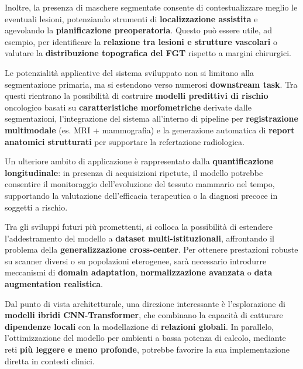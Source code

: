 Inoltre, la presenza di maschere segmentate consente di contestualizzare meglio le eventuali lesioni, potenziando strumenti di \textbf{localizzazione assistita} e agevolando la \textbf{pianificazione preoperatoria}. Questo può essere utile, ad esempio, per identificare la \textbf{relazione tra lesioni e strutture vascolari} o valutare la \textbf{distribuzione topografica del FGT} rispetto a margini chirurgici.


Le potenzialità applicative del sistema sviluppato non si limitano alla segmentazione primaria, ma si estendono verso numerosi \textbf{downstream task}. Tra questi rientrano la possibilità di costruire \textbf{modelli predittivi di rischio} oncologico basati su \textbf{caratteristiche morfometriche} derivate dalle segmentazioni, l’integrazione del sistema all’interno di pipeline per \textbf{registrazione multimodale} (es. MRI + mammografia) e la generazione automatica di \textbf{report anatomici strutturati} per supportare la refertazione radiologica.

Un ulteriore ambito di applicazione è rappresentato dalla \textbf{quantificazione longitudinale}: in presenza di acquisizioni ripetute, il modello potrebbe consentire il monitoraggio dell’evoluzione del tessuto mammario nel tempo, supportando la valutazione dell’efficacia terapeutica o la diagnosi precoce in soggetti a rischio.


Tra gli sviluppi futuri più promettenti, si colloca la possibilità di estendere l’addestramento del modello a \textbf{dataset multi-istituzionali}, affrontando il problema della \textbf{generalizzazione cross-center}. Per ottenere prestazioni robuste su scanner diversi o su popolazioni eterogenee, sarà necessario introdurre meccanismi di \textbf{domain adaptation}, \textbf{normalizzazione avanzata} o \textbf{data augmentation realistica}.

Dal punto di vista architetturale, una direzione interessante è l’esplorazione di \textbf{modelli ibridi CNN-Transformer}, che combinano la capacità di catturare \textbf{dipendenze locali} con la modellazione di \textbf{relazioni globali}. In parallelo, l’ottimizzazione del modello per ambienti a bassa potenza di calcolo, mediante reti \textbf{più leggere e meno profonde}, potrebbe favorire la sua implementazione diretta in contesti clinici.



